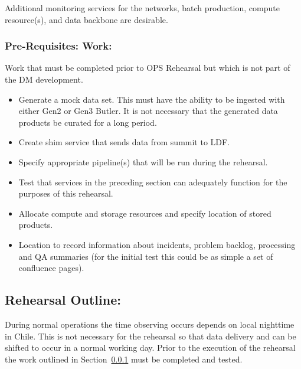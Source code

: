 Additional monitoring services for the networks, batch production, compute 
resource(s), and data backbone are desirable.

\subsubsection{Pre-Requisites: Work:}\label{prework}

Work that must be completed prior to OPS Rehearsal but which is not part of 
the DM development.
\begin{itemize}[topsep=-8pt]
\item Generate a mock data set.  This must have the ability to be ingested with 
either Gen2 or Gen3 Butler.  It is not necessary that the generated data 
products be curated for a long period.
\item Create shim service that sends data from summit to LDF.
\item Specify appropriate pipeline(s) that will be run during the rehearsal.
\item Test that services in the preceding section can adequately function 
for the purposes of this rehearsal.
\item Allocate compute and storage resources and specify location of stored 
products.
\item Location to record information about incidents, problem backlog, 
processing and QA summaries (for the initial test this could be as simple a 
set of confluence pages).
\end{itemize}


\subsection{Rehearsal Outline:}
During normal operations the time observing occurs depends on local nighttime
in Chile.  This is not necessary for the rehearsal so that data delivery and
can be shifted to occur in a normal working day.  Prior to the execution of 
the rehearsal the work outlined in Section~\ref{prework} must be completed
and tested.

